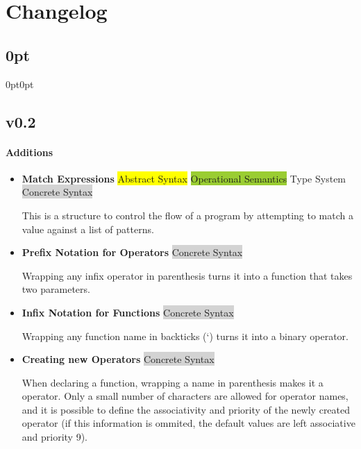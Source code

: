 \documentclass{article}
\begin{document}
\section{Changelog}

\titlespacing\subsection{0pt}{0pt}{0pt}

\subsection*{v0.2}
{\small{}}

\paragraph{\large Additions}

\begin{itemize}
  \item \textbf{Match Expressions} \; \; {\small\colorbox{yellow}{Abstract Syntax} \colorbox{YellowGreen}{Operational Semantics} \colorbox{ProcessBlue}{Type System} \colorbox{lightgray}{Concrete Syntax}}

      This is a structure to control the flow of a program by attempting to match a value against a list of patterns.

  \item \textbf{Prefix Notation for Operators} \; \; {\small\colorbox{lightgray}{Concrete Syntax}}

      Wrapping any infix operator in parenthesis turns it into a function that takes two parameters.

  \item \textbf{Infix Notation for Functions} \; \; {\small\colorbox{lightgray}{Concrete Syntax}}

      Wrapping any function name in backticks (\lq) turns it into a binary operator.

  \item \textbf{Creating new Operators} \; \; {\small\colorbox{lightgray}{Concrete Syntax}}

      When declaring a function, wrapping a name in parenthesis makes it a operator.
      Only a small number of characters are allowed for operator names, and it is possible to define the associativity and priority of the newly created operator (if this information is ommited, the default values are left associative and priority 9).

\end{itemize}
\end{document}
